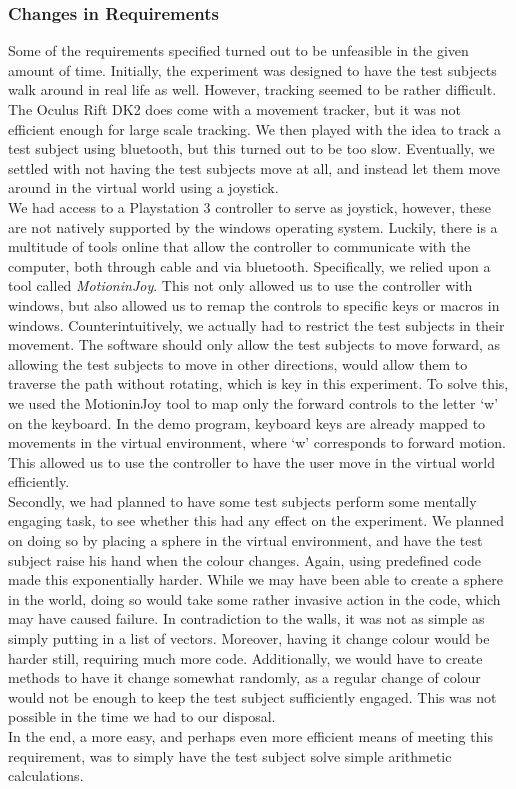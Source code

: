 \subsubsection{Changes in Requirements}
Some of the requirements specified turned out to be unfeasible in the given amount of time.
Initially, the experiment was designed to have the test subjects walk around in real life as well.
However, tracking seemed to be rather difficult.
The Oculus Rift DK2 does come with a movement tracker, but it was not efficient enough for large scale tracking.
We then played with the idea to track a test subject using bluetooth, but this turned out to be too slow.
Eventually, we settled with not having the test subjects move at all, and instead let them move around in the virtual world using a joystick. \\
We had access to a Playstation 3 controller to serve as joystick, however, these are not natively supported by the windows operating system.
Luckily, there is a multitude of tools online that allow the controller to communicate with the computer, both through cable and via bluetooth.
Specifically, we relied upon a tool called \textit{MotioninJoy}.
This not only allowed us to use the controller with windows, but also allowed us to remap the controls to specific keys or macros in windows.
Counterintuitively, we actually had to restrict the test subjects in their movement.
The software should only allow the test subjects to move forward, as allowing the test subjects to move in other directions, would allow them to traverse the path without rotating, which is key in this experiment.
To solve this, we used the MotioninJoy tool to map only the forward controls to the letter `w' on the keyboard.
In the demo program, keyboard keys are already mapped to movements in the virtual environment, where `w' corresponds to forward motion.
This allowed us to use the controller to have the user move in the virtual world efficiently. \\

Secondly, we had planned to have some test subjects perform some mentally engaging task, to see whether this had any effect on the experiment.
We planned on doing so by placing a sphere in the virtual environment, and have the test subject raise his hand when the colour changes.
Again, using predefined code made this exponentially harder.
While we may have been able to create a sphere in the world, doing so would take some rather invasive action in the code, which may have caused failure.
In contradiction to the walls, it was not as simple as simply putting in a list of vectors.
Moreover, having it change colour would be harder still, requiring much more code.
Additionally, we would have to create methods to have it change somewhat randomly, as a regular change of colour would not be enough to keep the test subject sufficiently engaged.
This was not possible in the time we had to our disposal. \\
In the end, a more easy, and perhaps even more efficient means of meeting this requirement, was to simply have the test subject solve simple arithmetic calculations. 